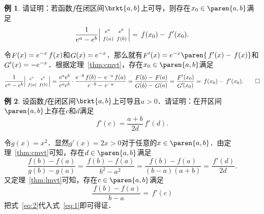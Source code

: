 \documentclass[a4paper,punct=CCT]{ctexbook}
\makeatletter
\theoremstyle{definition}
\newtheorem*{example*}{例}
\theoremstyle{remark}
\renewcommand*{\proofname}{证}
\renewenvironment{proof}[1][\proofname]{\par
  \pushQED{\qed}%
  \normalfont \topsep6\p@\@plus6\p@\relax
  \trivlist
  \item[\hskip\labelsep
    \bfseries
    #1%
    ]\ignorespaces
}{%
  \popQED\endtrivlist\@endpefalse
}
\makeatother
\begin{document}
\begin{example*}
  请证明：若函数\(f\)在闭区间\(\brkt{a,b}\)上可导，则存在\(x_0 \in \paren{a,b}\)满足
  \begin{equation*}
    \frac{1}{e^a - e^b}
    \begin{vsmallmatrix}
      e^a & e^b \\
      \,f(a) & \,f(b) \rule{0ex}{2ex}
    \end{vsmallmatrix}
    = \,f(x_0) - \,f'(x_0).
  \end{equation*}

  \begin{proof}
    令\(\mathop{\relax F}\nolimits(x) = e^{-x}\,f(x)\)和\(\mathop{\relax G}\nolimits(x) = e^{-x}\)．那么就有\(\Fn F'(x) = e^{-x}\paren{\,f'(x) - \,f(x)}\)和\(\mathop{\relax G}\nolimits'(x) = -e^{-x}\)．根据定理~\ref{thm:cmvt}，存在\(x_0 \in \paren{a,b}\)满足
    \begin{equation*}
      \frac{1}{e^a - e^b}
      \begin{vsmallmatrix}
        e^a & e^b \\
        \,f(a) & \,f(b) \rule{0ex}{2ex}
      \end{vsmallmatrix}
      = \frac{e^a e^b}{e^a e^b}
      \cdot \frac{e^{-b}\,f(b) - \,e^{-a}\,f(a)}{\mkern.5mu e^{-b}-\,e^{-a}}
      = \frac{\Fn F(\Fn b) - \,\Fn F(a)}{\Fn G(\Fn b) - \,\Fn G(a)}
      = \frac{\mkern1mu\Fn F'(x_0)}{\Fn G'\mkern-2mu(x_0)}
      = \,f(x_0) - \,f'(x_0).
      \qedhere
    \end{equation*}
  \end{proof}
\end{example*}

\begin{example*}
  设函数\(f\)在闭区间\(\brkt{a,b}\)上可导且\(a > 0\)．请证明：在开区间\(\paren{a,b}\)上存在\(c\)和\(d\)满足
  \begin{equation*}
    f'(c) = \frac{a+b}{2d} \,f'(d).
  \end{equation*}

  \begin{proof}
    令\(g(x) = x^2\)．显然\(g'(x) = 2x > 0\)对于任意的\(x \in \paren{a,b}\)．由定理~\ref{thm:cmvt}可知，存在\(d \in \paren{a,b}\)满足
    \begin{equation}
      \frac{f(b)-f(a)}{g(b) - g(a)}
      = \frac{\,f(b)-f(a)}{b^2 - a^2}
      = \frac{f(b)-f(a)}{(b-a)(a+b)}
      = \frac{\,f'(d)}{2d}.
      \label{eq:1}
    \end{equation}
    又定理~\ref{thm:lmvt}可知，存在\(c \in \paren{a,b}\)满足
    \begin{equation}
      \frac{\,f(b)-f(a)}{b-a} = \,f'(c)
      \label{eq:2}
    \end{equation}
    把式~\eqref{eq:2}代入式~\eqref{eq:1}即可得证．
  \end{proof}
\end{example*}
\end{document}

